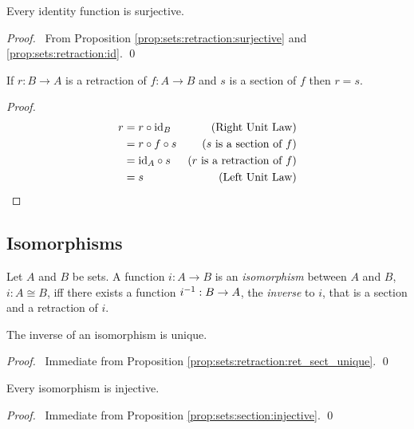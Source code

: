 \begin{prop}
Every identity function is surjective.
\end{prop}

\begin{proof}
  \pf\ From Proposition \ref{prop:sets:retraction:surjective} and
  \ref{prop:sets:retraction:id}. \qed
\end{proof}

\begin{prop}
\label{prop:sets:retraction:ret_sect_unique}
If $r : B \rightarrow A$ is a retraction of $f : A \rightarrow B$ and $s$ is a section of $f$  then $ r = s$.
\end{prop}

\begin{proof}
\pf
\begin{align*}
r & = r \circ \mathrm{id}_{B} & (\text{Right Unit Law}) \\
& = r \circ f \circ s & (\text{$s$ is a section of $f$}) \\
& = \mathrm{id}_{A} \circ s & (\text{$r$ is a retraction of $f$}) \\
& = s & (\text{Left Unit Law})
\end{align*}
\end{proof}

\subsection{Isomorphisms}

\begin{df}[Isomorphism]
Let $A$ and $B$ be sets. A function $i : A \rightarrow B$  is an
\emph{isomorphism} between $A$ and $B$, $i : A \cong B$, iff there exists a
function ${i}^{-1} : B \rightarrow A$, the \emph{inverse} to $i$, that is a
section and a retraction of $i$.
\end{df}

\begin{prop}
The inverse of an isomorphism is unique.
\end{prop}

\begin{proof}
\pf\ Immediate from Proposition \ref{prop:sets:retraction:ret_sect_unique}. \qed
\end{proof}

\begin{prop}
Every isomorphism is injective.
\end{prop}

\begin{proof}
\pf\ Immediate from Proposition \ref{prop:sets:section:injective}. \qed
\end{proof}

